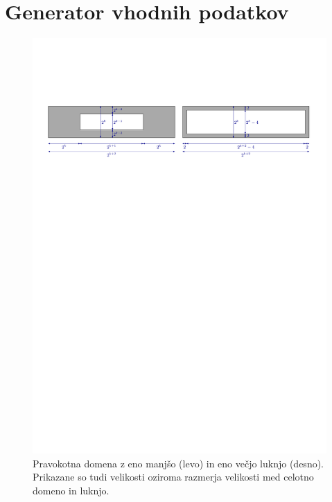 \documentclass[a4paper, 12pt]{book}
\begin{document}
\section{Generator vhodnih podatkov}
\begin{figure}
\centerline{\includegraphics[scale=0.75, page=1]{pics/data_generation.pdf}}
\caption{Pravokotna domena z eno manjšo (levo) in eno večjo luknjo (desno). Prikazane so tudi velikosti oziroma razmerja velikosti med celotno domeno in luknjo.}
\label{generation1}
\end{figure}
\end{document}
